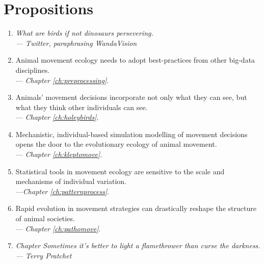 \begingroup

\chapter*{Propositions}

\begin{onehalfspace}
    
    \begin{enumerate}
        \item \textit{What are birds if not dinosaurs persevering.\\--- Twitter, paraphrasing WandaVision}
        \item Animal movement ecology needs to adopt best-practices from other big-data disciplines.\\ --- \textit{Chapter \ref{ch:preprocessing}}.
        \item Animals' movement decisions incorporate not only what they can see, but what they think other individuals can see.\\ --- \textit{Chapter \ref{ch:holeybirds}}.
        \item Mechanistic, individual-based simulation modelling of movement decisions opens the door to the evolutionary ecology of animal movement. \\ --- \textit{Chapter \ref{ch:kleptomove}}.
        \item Statistical tools in movement ecology are sensitive to the scale and mechanisms of individual variation.\\ ---\textit{Chapter \ref{ch:patternprocess}}.
        \item Rapid evolution in movement strategies can drastically reshape the structure of animal societies.\\ --- \textit{Chapter \ref{ch:pathomove}}.
        \item \textit{Chapter Sometimes it's better to light a flamethrower than curse the darkness.\\--- Terry Pratchet}
    \end{enumerate}

\end{onehalfspace}

\endgroup

\vfill

\clearpage
